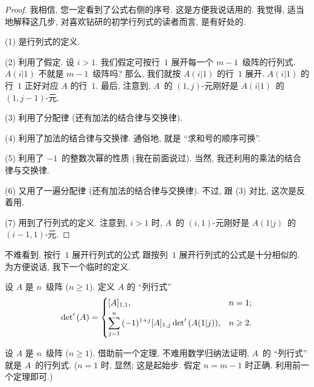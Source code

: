 \documentclass[%
    UTF8,%
    fontset=none,%
    punct=kaiming,%
    zihao=-4,%
    a4paper,%
    oneside,%
]{ctexbook}
\renewcommand*{\geq}{\geqslant}
\begin{document}
\begin{proof}
    我相信, 您一定看到了公式右侧的序号.
    这是方便我说话用的.
    我觉得, 适当地解释这几步,
    对喜欢钻研的初学行列式的读者而言, 是有好处的.

    (1) 是行列式的定义.

    (2) 利用了假定.
    设 \(i > 1\).
    我们假定可按行~\(1\) 展开每一个 \(m - 1\)~级阵的行列式.
    \(A(i|1)\) 不就是 \(m - 1\)~级阵吗?
    那么, 我们就按 \(A(i|1)\) 的行~\(1\) 展开.
    \(A(i|1)\) 的行~\(1\) 正好对应
    \(A\) 的行~\(1\).
    最后, 注意到,
    \(A\)~的 \((1, j)\)-元刚好是
    \(A(i|1)\)~的 \((1, j - 1)\)-元.

    (3) 利用了分配律 (还有加法的结合律与交换律).

    (4) 利用了加法的结合律与交换律.
    通俗地, 就是 ``求和号的顺序可换''.

    (5) 利用了 \(-1\)~的整数次幂的性质 (我在前面说过).
    当然, 我还利用的乘法的结合律与交换律.

    (6) 又用了一遍分配律 (还有加法的结合律与交换律).
    不过, 跟 (3) 对比, 这次是反着用.

    (7) 用到了行列式的定义.
    注意到, \(i > 1\) 时,
    \(A\)~的 \((i, 1)\)-元刚好是
    \(A(1|j)\)~的 \((i - 1, 1)\)-元.
\end{proof}

不难看到, 按行~\(1\) 展开行列式的公式%
跟按列~\(1\) 展开行列式的公式是十分相似的.
为方便说话, 我下一个临时的定义.

\begin{definition}[``列行式'']
    设 \(A\) 是 \(n\)~级阵 (\(n \geq 1\)).
    定义 \(A\) 的 ``列行式''
    \begin{align*}
        \operatorname{det}' {(A)}
        =
        \begin{dcases}
            [A]_{1,1},
             & n = 1;    \\
            \sum_{j = 1}^{n}
            {(-1)^{1+j} [A]_{1,j} \operatorname{det}' {(A(1|j))}},
             & n \geq 2.
        \end{dcases}
    \end{align*}
\end{definition}

设 \(A\) 是 \(n\)~级阵 (\(n \geq 1\)).
借助前一个定理,
不难用数学归纳法证明,
\(A\)~的 ``列行式'' 就是
\(A\)~的行列式.
(\(n = 1\) 时, 显然; 这是起始步.
假定 \(n = m - 1\) 时正确.
利用前一个定理即可.)
\end{document}

